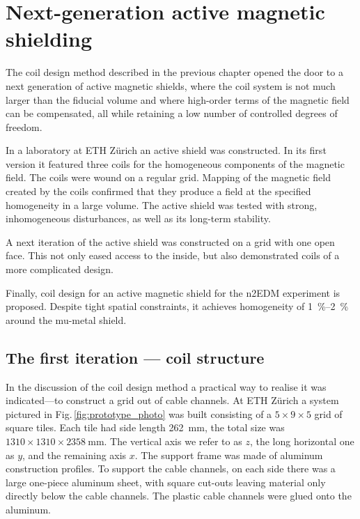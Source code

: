\chapter{Next-generation active magnetic shielding}
\label{ch:sfc-prototype}

The coil design method described in the previous chapter opened the door to a next generation of active magnetic shields, where the coil system is not much larger than the fiducial volume and where high-order terms of the magnetic field can be compensated, all while retaining a low number of controlled degrees of freedom.

In a laboratory at ETH Zürich an active shield was constructed.
In its first version it featured three coils for the homogeneous components of the magnetic field. The coils were wound on a regular grid.
Mapping of the magnetic field created by the coils confirmed that they produce a field at the specified homogeneity in a large volume.
The active shield was tested with strong, inhomogeneous disturbances, as well as its long-term stability.

A next iteration of the active shield was constructed on a grid with one open face.
This not only eased access to the inside, but also demonstrated coils of a more complicated design.

Finally, coil design for an active magnetic shield for the n2EDM experiment is proposed.
Despite tight spatial constraints, it achieves homogeneity of \SIrange[range-phrase=--,range-units=single]{1}{2}{\percent} around the mu-metal shield.




\section{The first iteration --- coil structure}
In the discussion of the coil design method a practical way to realise it was indicated---to construct a grid out of cable channels.
At ETH Zürich a system pictured in Fig.\,\ref{fig:prototype_photo} was built consisting of a $5 \times 9 \times 5$ grid of square tiles. Each tile had side length \SI{262}{\milli\meter}, the total size was $1310 \times 1310 \times \SI{2358}{\milli\meter}$.
The vertical axis we refer to as $z$, the long horizontal one as $y$, and the remaining axis $x$. The support frame was made of aluminum construction profiles.
To support the cable channels, on each side there was a large one-piece aluminum sheet, with square cut-outs leaving material only directly below the cable channels.
The plastic cable channels were glued onto the aluminum.

